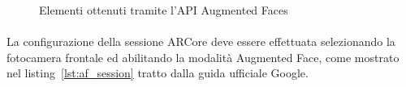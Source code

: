 \documentclass[crop=false, class=book]{standalone}
\begin{document}
	\begin{figure}
		\centering
		\caption{Elementi ottenuti tramite l'API Augmented Faces}
		\label{fig:augm_faces}
	\end{figure}
	
	\paragraph*{}
	La configurazione della sessione ARCore deve essere effettuata selezionando la fotocamera frontale ed abilitando la modalità Augmented Face, come mostrato nel listing~\vref{lst:af_session} tratto dalla guida ufficiale Google.
\end{document}
